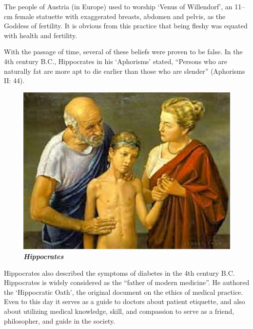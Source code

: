 The people of Austria (in Europe) used to worship ‘Venus of Willendorf’, an 11–cm female statuette with exaggerated breasts, abdomen and pelvis, as the Goddess of fertility. It is obvious from this practice that being fleshy was equated with health and fertility.

\newpage

With the passage of time, several of these beliefs were proven to be false. In the 4th century B.C., Hippocrates in his ‘Aphorisms’ stated, “Persons who are naturally fat are more apt to die earlier than those who are slender” (Aphorisms II: 44).

\begin{figure}
\centering
\includegraphics[scale=.9]{images/005.jpg}\\
\textbf{\textit{Hippocrates}}
\end{figure}

Hippocrates also described the symp\-toms of diabetes in the 4th century B.C. Hippocrates is widely considered as the “father of modern medicine”. He autho\-red the ‘Hippocratic Oath’, the original document on the ethics of medical pra\-ctice. Even to this day it serves as a guide to doctors about patient etiquette, and also about utilizing medical know\-ledge, skill, and compassion to serve as a friend, philosopher, and guide in the society.

